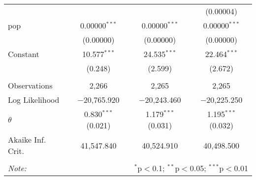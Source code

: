 \begin{table}[!htbp]
\begin{tabular}{@{\extracolsep{5pt}}lccc}
  &  &  & (0.00004) \\ 
  pop & 0.00000$^{***}$ & 0.00000$^{***}$ & 0.00000$^{***}$ \\ 
  & (0.00000) & (0.00000) & (0.00000) \\ 
  Constant & 10.577$^{***}$ & 24.535$^{***}$ & 22.464$^{***}$ \\ 
  & (0.248) & (2.599) & (2.672) \\ 
 \hline \\[-1.8ex] 
Observations & 2,266 & 2,265 & 2,265 \\ 
Log Likelihood & $-$20,765.920 & $-$20,243.460 & $-$20,225.250 \\ 
$\theta$ & 0.830$^{***}$  (0.021) & 1.179$^{***}$  (0.031) & 1.195$^{***}$  (0.032) \\ 
Akaike Inf. Crit. & 41,547.840 & 40,524.910 & 40,498.500 \\ 
\hline 
\hline \\[-1.8ex] 
\textit{Note:}  & \multicolumn{3}{r}{$^{*}$p$<$0.1; $^{**}$p$<$0.05; $^{***}$p$<$0.01} \\ 
\end{tabular} 
\end{table} 
